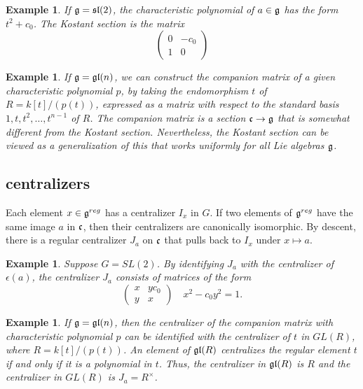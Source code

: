 \documentclass[brochure,english,12pt]{bourbaki}
\newtheorem{example}[equation]{Example}
\def\gl{\frak{gl}}
\def\sl{\frak{sl}}
\def\g{\frak{g}}
\def\c{\frak{c}}
\begin{document}
\begin{example}
If $\g=\sl(2)$, the characteristic polynomial of $a\in\g$ has the form $t^2  +c_0$.
The Kostant section is the matrix
\[
\begin{pmatrix} 0 & -c_0\\ 1 & 0\end{pmatrix}
\]
\end{example}


\begin{example}
  If $\g=\gl(n)$, we can construct the companion matrix of a given
  characteristic polynomial $p$, by taking the endomorphism $t$ of
  $R=k[t]/(p(t))$, expressed as a matrix with respect to the standard
  basis $1,t,t^2,\ldots,t^{n-1}$ of $R$.  The companion matrix is a
  section $\c\to\g$ that is somewhat different from the Kostant
  section.  Nevertheless, the Kostant section can be viewed as a
  generalization of this that works uniformly for all Lie algebras
  $\g$.
\end{example}


\subsection{centralizers}

Each element $x\in\g^{reg}$ has a centralizer $I_x$ in $G$.  If two
elements of $\g^{reg}$ have the same image $a$ in $\c$, then their
centralizers are canonically isomorphic.  By descent, there is a
regular centralizer $J_a$ on $\c$ that pulls back to $I_x$ under
$x\mapsto a$.



\begin{example}  Suppose $G=SL(2)$.  By identifying $J_a$ with the centralizer of
  $\epsilon(a)$, the centralizer $J_a$ consists of
  matrices of the form
\[
\begin{pmatrix} x & y c_0\\ y & x
\end{pmatrix}
\quad x^2 - c_0 y^2 = 1.
\]
\end{example}

\begin{example}
  If $\g=\gl(n)$, then the centralizer of the companion matrix with
  characteristic polynomial $p$ can be identified with the centralizer
  of $t$ in $GL(R)$, where $R=k[t]/(p(t))$.  An
  element of $\gl(R)$ centralizes the regular element $t$ if and only if it is a polynomial
  in $t$.  Thus, the centralizer in $\gl(R)$ is $R$ and the centralizer in $GL(R)$
 is $J_a = R^\times$.
\end{example}
\end{document}
